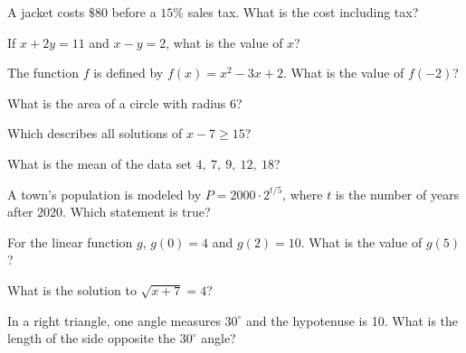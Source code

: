 \begin{exo}{}
A jacket costs $\$80$ before a $15\%$ sales tax. What is the cost including tax?
\end{exo}
\begin{exo}[Algebra]{}
If $x+2y=11$ and $x-y=2$, what is the value of $x$?
\end{exo}
\begin{exo}{\sprtag}
The function $f$ is defined by $f(x)=x^2-3x+2$. What is the value of $f(-2)$?
\end{exo}
\begin{exo}{}
What is the area of a circle with radius 6?
\choices{$12\pi$}{$36\pi$}{$6\pi$}{$144\pi$}
\end{exo}
\begin{exo}[Algebra]{}
Which describes all solutions of $x-7\ge15$?
\end{exo}
\begin{exo}{}
What is the mean of the data set $4,\ 7,\ 9,\ 12,\ 18$?
\end{exo}
\begin{exo}{}
A town's population is modeled by $P=2000\cdot2^{t/5}$, where $t$ is the number of years after 2020. Which statement is true?
\end{exo}
\begin{exo}[Algebra]{\sprtag}
For the linear function $g$, $g(0)=4$ and $g(2)=10$. What is the value of $g(5)$?
\end{exo}
\begin{exo}{}
What is the solution to $\sqrt{x+7}=4$?
\end{exo}
\begin{exo}{}
In a right triangle, one angle measures $30^\circ$ and the hypotenuse is 10. What is the length of the side opposite the $30^\circ$ angle?
\end{exo}
